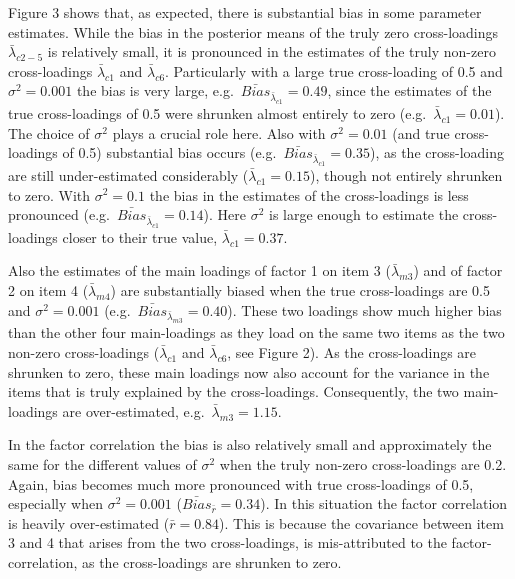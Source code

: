 \documentclass[
  man,floatsintext]{apa6}
\begin{document}
Figure 3 shows that, as expected, there is substantial bias in some parameter estimates. While the bias in the posterior means of the truly zero cross-loadings \(\bar{\lambda}_{c 2-5}\) is relatively small, it is pronounced in the estimates of the truly non-zero cross-loadings \(\bar{\lambda}_{c 1}\) and \(\bar{\lambda}_{c 6}\). Particularly with a large true cross-loading of 0.5 and \(\sigma^2 = 0.001\) the bias is very large, e.g.~\(\bar{Bias}_{\bar{\lambda}_{c 1}} = 0.49\), since the estimates of the true cross-loadings of 0.5 were shrunken almost entirely to zero (e.g.~\(\bar{\lambda}_{c 1} = 0.01\)). The choice of \(\sigma^2\) plays a crucial role here. Also with \(\sigma^2 = 0.01\) (and true cross-loadings of 0.5) substantial bias occurs (e.g.~\(\bar{Bias}_{\bar{\lambda}_{c 1}} = 0.35\)), as the cross-loading are still under-estimated considerably (\(\bar{\lambda}_{c 1} = 0.15\)), though not entirely shrunken to zero. With \(\sigma^2 = 0.1\) the bias in the estimates of the cross-loadings is less pronounced (e.g.~\(\bar{Bias}_{\bar{\lambda}_{c 1}} = 0.14\)). Here \(\sigma^2\) is large enough to estimate the cross-loadings closer to their true value, \(\bar{\lambda}_{c 1} = 0.37\).

Also the estimates of the main loadings of factor 1 on item 3 (\(\bar{\lambda}_{m 3}\)) and of factor 2 on item 4 (\(\bar{\lambda}_{m 4}\)) are substantially biased when the true cross-loadings are 0.5 and \(\sigma^2 = 0.001\) (e.g.~\(\bar{Bias}_{\bar{\lambda}_{m 3}} = 0.40\)). These two loadings show much higher bias than the other four main-loadings as they load on the same two items as the two non-zero cross-loadings (\(\bar{\lambda}_{c 1}\) and \(\bar{\lambda}_{c 6}\), see Figure 2). As the cross-loadings are shrunken to zero, these main loadings now also account for the variance in the items that is truly explained by the cross-loadings. Consequently, the two main-loadings are over-estimated, e.g.~\(\bar{\lambda}_{m 3} = 1.15\).

In the factor correlation the bias is also relatively small and approximately the same for the different values of \(\sigma^2\) when the truly non-zero cross-loadings are 0.2. Again, bias becomes much more pronounced with true cross-loadings of 0.5, especially when \(\sigma^2 = 0.001\) (\(\bar{Bias}_{\bar{r}} = 0.34\)). In this situation the factor correlation is heavily over-estimated (\(\bar{r} = 0.84\)). This is because the covariance between item 3 and 4 that arises from the two cross-loadings, is mis-attributed to the factor-correlation, as the cross-loadings are shrunken to zero.
\end{document}
